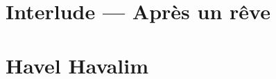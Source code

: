 \documentclass[11pt]{memoir}
\begin{document}
  \part{Interlude — Après un rêve}
  

  \part{Havel Havalim}
  

  \backmatter

  

  
\end{document}

